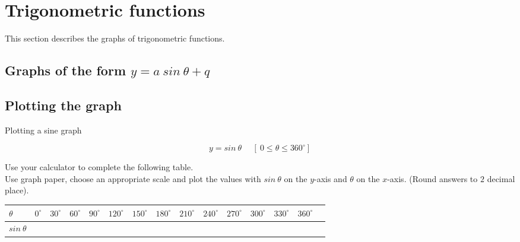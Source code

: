 \section{Trigonometric functions}
\nopagebreak
This section describes the graphs of trigonometric functions.\par 

\subsection{Graphs of the form $y=a~sin~\theta+q$}
\subsection*{Plotting the graph}
\begin{wex}
 {Plotting a sine graph}
{
\begin{equation*}
 y=sin~ \theta~~~~~~[~0 \leq \theta \leq 360^{\circ}]
\end{equation*}


Use your calculator to complete the following table. \\
Use graph paper, choose an appropriate scale and plot the values with $sin~\theta $ on the $y$-axis and $\theta $ on the $x$-axis. (Round answers to $2$ decimal place). 


\begin{table}[H]


\begin{tabular}{|m{0.6cm}|m{0.5cm}|m{0.5cm}|m{0.5cm}|m{0.5cm}|m{0.5cm}|m{0.5cm}|m{0.5cm}|m{0.5cm}|m{0.5cm}|m{0.5cm}|m{0.5cm}|m{0.5cm}|m{0.5cm}|} \hline

\footnotesize$\theta $&
\footnotesize$0^{\circ }$&
\footnotesize$30^{\circ }$&
\footnotesize$60^{\circ }$&
\footnotesize$90^{\circ }$&
\footnotesize$120^{\circ }$&
\footnotesize$150^{\circ }$&
\footnotesize$180^{\circ }$&
\footnotesize$210^{\circ }$&
\footnotesize$240^{\circ }$&
\footnotesize$270^{\circ }$&
\footnotesize$300^{\circ }$&
\footnotesize$330^{\circ }$&
\footnotesize$360^{\circ }$
\\ \hline

\footnotesize$sin~\theta $&
&
&
&
&
&
&
&
&
&
&
&
&
&

 \hline
\end{tabular}

\end{table}
}
{
\begin{table}[H]


\end{table}}
\end{wex}
